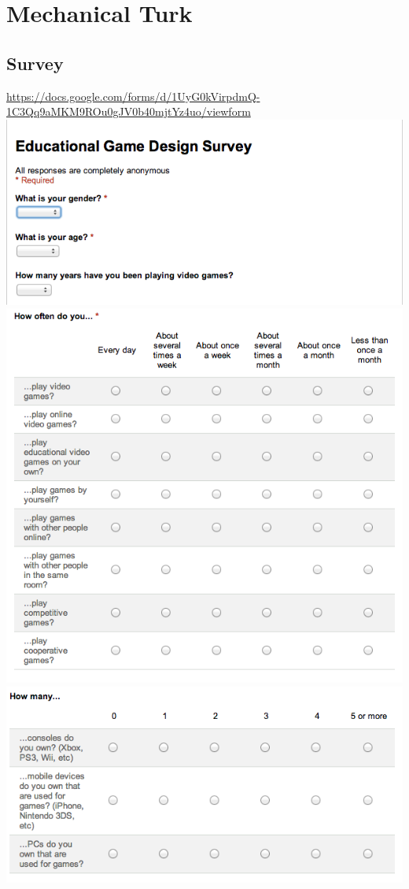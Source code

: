 \section{Mechanical Turk}
	
	\subsection{Survey}
		\url{https://docs.google.com/forms/d/1UyG0kVirpdmQ-1C3Qq9aMKM9ROu0gJV0b40mjtYz4uo/viewform} \\
		\includegraphics[width = \textwidth]{img/survey1.png}
		\includegraphics[width = \textwidth]{img/survey2.png}
		\includegraphics[width = \textwidth]{img/survey3.png}
